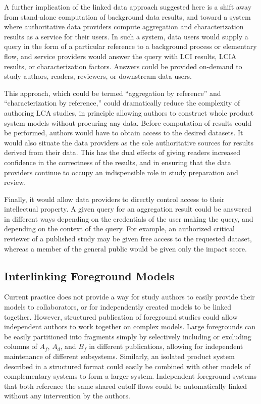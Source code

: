 A further implication of the linked data approach suggested here is a shift away from stand-alone computation of background data results, and toward a system where authoritative data providers compute aggregation and characterization results as a service for their users.  In such a system, data users would supply a query in the form of a particular reference to a background process or elementary flow, and service providers would answer the query with LCI results, LCIA results, or characterization factors.  Answers could be provided on-demand to study authors, readers, reviewers, or downstream data users.

This approach, which could be termed ``aggregation by reference'' and ``characterization by reference,'' could dramatically reduce the complexity of authoring LCA studies, in principle allowing authors to construct whole product system models without procuring any data.  Before computation of results could be performed, authors would have to obtain access to the desired datasets.  It would also situate the data providers as the sole authoritative sources for results derived from their data.  This has the dual effects of giving readers increased confidence in the correctness of the results, and in ensuring that the data providers continue to occupy an indispensible role in study preparation and review.

Finally, it would allow data providers to directly control access to their intellectual property.  A given query for an aggregation result could be answered in different ways depending on the credentials of the user making the query, and depending on the context of the query.  For example, an authorized critical reviewer of a published study may be given free access to the requested dataset, whereas a member of the general public would be given only the impact score.

\subsection{Interlinking Foreground Models}

Current practice does not provide a way for study authors to easily provide their models to collaborators, or for  independently created models to be linked together.  However, structured publication of foreground studies could allow independent authors to work together on complex models.  Large foregrounds can be easily partitioned into fragments simply by selectively including or excluding columns of $A_f$, $A_d$, and $B_f$ in different publications, allowing for independent maintenance of different subsystems. Similarly, an isolated product system described in a structured format could easily be combined with other models of complementary systems to form a larger system.  Independent foreground systems that both reference the same shared cutoff flows could be automatically linked without any intervention by the authors.

